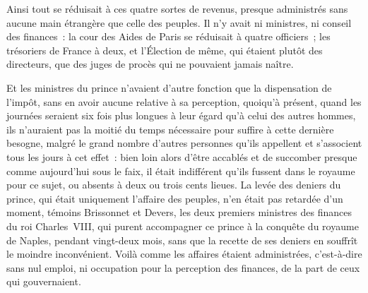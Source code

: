 \documentclass[french,twoside]{book} %
\begin{document}
Ainsi tout se réduisait à ces quatre sortes de revenus, presque administrés sans aucune main étrangère que celle des peuples. Il n’y avait ni ministres, ni conseil des finances : la cour des Aides de Paris se réduisait à quatre officiers ; les trésoriers de France à deux, et l’Élection de même, qui étaient plutôt des directeurs, que des juges de procès qui ne pouvaient jamais naître.\par
Et les ministres du prince n’avaient d’autre fonction que la dispensation de l’impôt, sans en avoir aucune relative à sa perception, quoiqu’à présent, quand les journées seraient six fois plus longues à leur égard qu’à celui des autres hommes, ils n’auraient pas la moitié du temps nécessaire pour suffire à cette dernière besogne, malgré le grand nombre d’autres personnes qu’ils appellent et s’associent tous les jours à cet effet : bien loin alors d’être accablés et de succomber presque comme aujourd’hui sous le faix, il était indifférent qu’ils fussent dans le royaume pour ce sujet, ou absents à deux ou trois cents lieues. La levée des deniers du prince, qui était uniquement l’affaire des peuples, n’en était pas retardée d’un moment, témoins Brissonnet et Devers, les deux premiers ministres des finances du roi Charles VIII, qui purent accompagner ce prince à la conquête du royaume de Naples, pendant vingt-deux mois, sans que la recette de ses deniers en souffrît le moindre inconvénient. Voilà comme les affaires étaient administrées, c’est-à-dire sans nul emploi, ni occupation pour la perception des finances, de la part de ceux qui gouvernaient.\par
\end{document}
